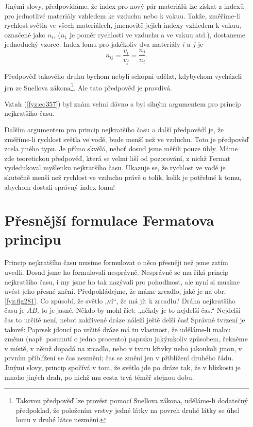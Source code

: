 {    Jinými slovy, předpovídáme, že index pro nový pár materiálů lze získat z indexů pro jednotlivé 
    materiály vzhledem ke vzduchu nebo k vakuu. Takže, změříme-li rychlost světla ve všech 
    materiálech, jmenovitě jejich indexy vzhledem k vakuu, označené jako \(n_i\), (\(n_1\) je poměr 
    rychlosti ve vzduchu a ve vakuu atd.), dostaneme jednoduchý vzorec. Index lomu pro jakékoliv 
    dva materiály \(i\) a \(j\) je
    \begin{equation}\label{fyz:eq358}
      n_{ij} = \frac{v_i}{v_j} = \frac{n_j}{n_i}.
    \end{equation}
    
    Předpověď takového druhu bychom nebyli schopni udělat, kdybychom vycházeli jen ze Snellova 
    zákona\footnote{Takovou předpověď lze provést pomocí Snellova zákona, uděláme-li dodatečný 
    předpoklad, že položením vrstvy jedné látky na povrch druhé látky se úhel lomu v druhé látce 
    nezmění.}. Ale tato předpověď je pravdivá.
    
    Vztah (\ref{fyz:eq357}) byl znám velmi dávno a byl silným argumentem pro princip nejkratšího 
    času.
    
    Dalším argumentem pro princip nejkratšího času a další předpovědí je, že změříme-li rychlost 
    světla ve vodě, bude menší než ve vzduchu. Toto je předpověď zcela jiného typu. Je přímo 
    skvělá, neboť dosud jsme měřili pouze úhly. Máme zde teoretickou předpověď, která se velmi liší 
    od pozorování, z nichž Fermat vydedukoval myšlenku nejkratšího času. Ukazuje se, že rychlost ve 
    vodě je skutečně menší než rychlost ve vzduchu právě o tolik, kolik je potřebné k tomu, abychom 
    dostali správný index lomu!
    
  \section{Přesnější formulace Fermatova principu}\label{fyz:IchapXXVIsecV}
    Princip nejkratšího času musíme formulovat o něco přesněji než jsme zatím uvedli. Dosud jsme ho 
    formulovali nesprávně. Nesprávně se mu říká princip nejkratšího času, i my jsme ho tak nazývali 
    pro pohodlnost, ale nyní si musíme uvést jeho přesné znění. Předpokládejme, že máme zrcadlo, 
    jaké je na obr. \ref{fyz:fig281}. Co způsobí, že světlo „ví“, že má jít k zrcadlu? Dráha 
    nejkratšího času je \(AB\), to je jasné. Někdo by mohl říct: „někdy je to nejdelší čas.“ 
    Nejdelší čas to určitě není, neboť zakřivené dráze náleží ještě delší čas! Správné tvrzení je 
    takové: Paprsek jdoucí po určité dráze má tu vlastnost, že uděláme-li malou změnu (např. 
    posunutí o jedno procento) paprsku jakýmkoliv způsobem, řekněme v místě, v němž dopadá na 
    zrcadlo, nebo v tvaru křivky nebo jakoukoli jinou, v prvním přiblížení se čas nezmění; čas se 
    změní jen v přiblížení druhého řádu. Jinými slovy, princip spočívá v tom, že světlo jde po 
    dráze tak, že v blízkosti je mnoho jiných drah, po nichž mu cesta trvá téměř stejnou dobu.
    
}
